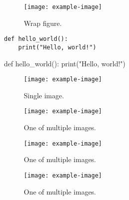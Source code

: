 \documentclass{article}
\begin{document}
\lipsum[1-2]
\begin{wrapfigure}[14]{R}{0.4\textwidth}
    \vspace{-10pt}
    \centering
    \texttt{[image: example-image]}
    \vspace{-15pt}
    \caption{Wrap figure.}
    \label{fig:wrap-figure}
\end{wrapfigure}
\lipsum[4-5]
\begin{wraptable}[10]{L}{0.4\textwidth}
    \vspace{-12pt}
    \centering
    \caption{Wrap table.}
    \label{tab:warp-table}
    \vspace{-8pt}
\end{wraptable}
\lipsum[6-8]


\begin{lstlisting}
def hello_world():
    print("Hello, world!")
\end{lstlisting}
\begin{python}
    def hello_world():
    print("Hello, world!")
\end{python}



\begin{figure}[ht]
    \centering
    \texttt{[image: example-image]}
    \caption{Single image.}
    \label{fig:single}
\end{figure}


\begin{figure}[ht]
    \centering
    \begin{minipage}{0.32\textwidth}
        \texttt{[image: example-image]}
        \caption{One of multiple images.}
        \label{fig:multiple-images-1}
    \end{minipage}
    \hfill
    \begin{minipage}{0.32\textwidth}
        \texttt{[image: example-image]}
        \caption{One of multiple images.}
        \label{fig:multiple-images-2}
    \end{minipage}
    \hfill
    \begin{minipage}{0.32\textwidth}
        \texttt{[image: example-image]}
        \caption{One of multiple images.}
        \label{fig:multiple-images-3}
    \end{minipage}
\end{figure}
\end{document}
